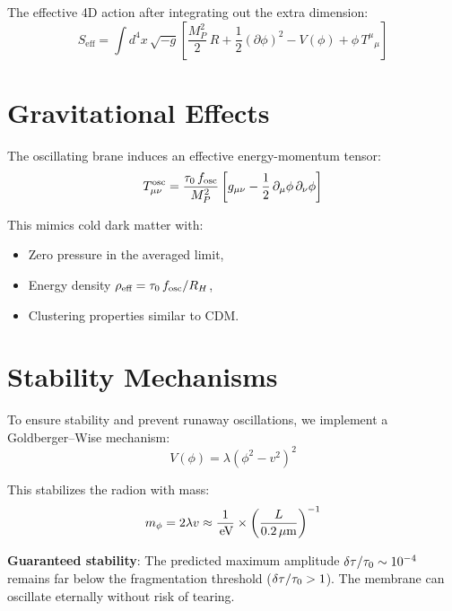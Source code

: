 The effective 4D action after integrating out the extra dimension:
\begin{equation}
S_\text{eff} = \int d^4x\,\sqrt{-g}\left[\frac{M_P^2}{2}\,R + \frac{1}{2}(\partial\phi)^2 - V(\phi) + \phi\,T^\mu{}_\mu\right]
\end{equation}

\section{Gravitational Effects}
\label{sec:grav_effects}

The oscillating brane induces an effective energy-momentum tensor:
\begin{equation}
T_{\mu\nu}^\text{osc} = \frac{\tau_0\,f_\text{osc}}{M_P^2}\left[g_{\mu\nu} - \frac{1}{2}\,\partial_\mu\phi\,\partial_\nu\phi\right]
\end{equation}

This mimics cold dark matter with:
\begin{itemize}
  \item Zero pressure in the averaged limit,
  \item Energy density $\rho_\text{eff} = \tau_0\,f_\text{osc}/R_H$,
  \item Clustering properties similar to CDM.
\end{itemize}

\section{Stability Mechanisms}
\label{sec:stability_mechanisms}

To ensure stability and prevent runaway oscillations, we implement a Goldberger--Wise mechanism:
\begin{equation}
V(\phi) = \lambda\left(\phi^2 - v^2\right)^2
\end{equation}

This stabilizes the radion with mass:
\begin{equation}
m_\phi = 2\lambda v \approx \frac{1}{\,\text{eV}} \times \left(\frac{L}{0.2\,\mu\text{m}}\right)^{-1}
\end{equation}

\textbf{Guaranteed stability}: The predicted maximum amplitude $\delta\tau/\tau_0 \sim 10^{-4}$ remains far below the fragmentation threshold ($\delta\tau/\tau_0 > 1$). The membrane can oscillate eternally without risk of tearing.

